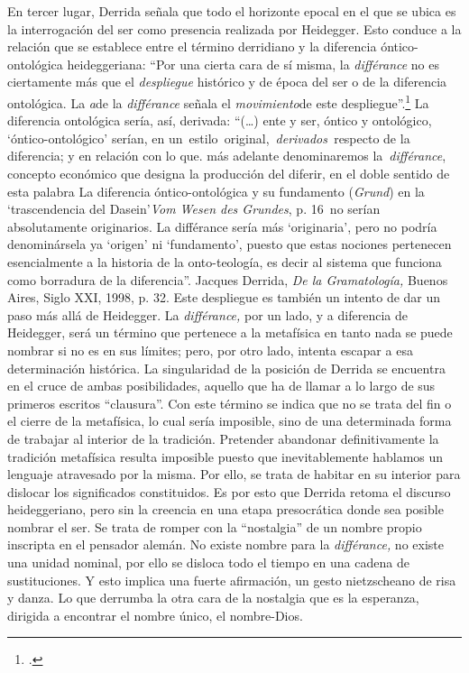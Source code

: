 En tercer lugar, Derrida señala que todo el horizonte epocal en el que se ubica es la interrogación del ser como presencia realizada por Heidegger. Esto conduce a la relación que se establece entre el término derridiano y la diferencia óntico-ontológica heideggeriana: \enquote{Por una cierta cara de sí misma, la \emph{différance} no es ciertamente más que el \emph{despliegue} histórico y de época del ser o de la diferencia ontológica. La \emph{a}de la \emph{différance} señala el \emph{movimiento}de este despliegue}.\footcite[23]{@6980-DERRIDA1989} La diferencia ontológica sería, así, derivada: \enquote{(\dots) ente y ser, óntico y ontológico, \enquote{óntico-ontológico} serían, en un~estilo\emph{~}original,~\emph{derivados~}respecto de la diferencia; y en relación con lo que. más adelante denominaremos la~\emph{différance}, concepto económico que designa la producción del diferir, en el doble sentido de esta palabra La diferencia óntico-ontológica y su fundamento (\emph{Grund}) en la \enquote{trascendencia del Dasein}\emph{Vom Wesen des Grundes}, p. 16\emph{~}no serían absolutamente originarios. La différance sería más \enquote{originaria}, pero no podría denominársela ya \enquote{origen} ni \enquote{fundamento}, puesto que estas nociones pertenecen esencialmente a la historia de la onto-teología, es decir al sistema que funciona como borradura de la diferencia}. Jacques Derrida, \emph{De la Gramatología,} Buenos Aires, Siglo XXI, 1998, p. 32. Este despliegue es también un intento de dar un paso más allá de Heidegger. La \emph{différance,} por un lado, y a diferencia de Heidegger, será un término que pertenece a la metafísica en tanto nada se puede nombrar si no es en sus límites; pero, por otro lado, intenta escapar a esa determinación histórica. La singularidad de la posición de Derrida se encuentra en el cruce de ambas posibilidades, aquello que ha de llamar a lo largo de sus primeros escritos \enquote{clausura}. Con este término se indica que no se trata del fin o el cierre de la metafísica, lo cual sería imposible, sino de una determinada forma de trabajar al interior de la tradición. Pretender abandonar definitivamente la tradición metafísica resulta imposible puesto que inevitablemente hablamos un lenguaje atravesado por la misma. Por ello, se trata de habitar en su interior para dislocar los significados constituidos. Es por esto que Derrida retoma el discurso heideggeriano, pero sin la creencia en una etapa presocrática donde sea posible nombrar el ser. Se trata de romper con la \enquote{nostalgia} de un nombre propio inscripta en el pensador alemán. No existe nombre para la \emph{différance,} no existe una unidad nominal, por ello se disloca todo el tiempo en una cadena de sustituciones. Y esto implica una fuerte afirmación, un gesto nietzscheano de risa y danza. Lo que derrumba la otra cara de la nostalgia que es la esperanza, dirigida a encontrar el nombre único, el nombre-Dios.

